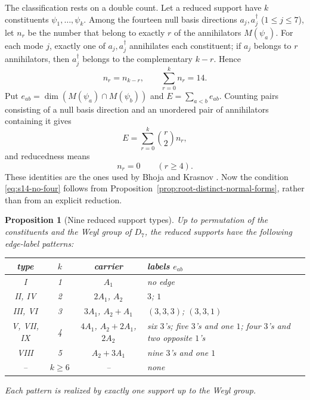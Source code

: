 \documentclass{article}
\newtheorem{proposition}[theorem]{Proposition}
\theoremstyle{definition}
\theoremstyle{remark}
\begin{document}
The classification rests on a double count. Let a reduced support
have $k$ constituents $\psi_1,\ldots,\psi_k$. Among the
fourteen null basis directions $a_j,a_j^\dagger$ ($1\le j\le7$), let $n_r$ be
the number that belong to exactly $r$ of the annihilators
$M(\psi_a)$. For each mode $j$, exactly one of $a_j,a_j^\dagger$ annihilates
each constituent; if $a_j$ belongs to $r$ annihilators, then $a_j^\dagger$
belongs to the complementary $k-r$. Hence
\begin{equation}
 n_r=n_{k-r},\qquad \sum_{r=0}^k n_r=14.
 \label{eq:s14-nr}
\end{equation}
Put $e_{ab}=\dim(M(\psi_a)\cap M(\psi_b))$ and $E=\sum_{a<b}e_{ab}$. Counting
pairs consisting of a null basis direction and an unordered pair of
annihilators containing it gives
\begin{equation}
 E=\sum_{r=0}^k\binom r2 n_r ,
 \label{eq:s14-incidence}
\end{equation}
and reducedness means
\begin{equation}
 n_r=0\qquad(r\ge4).
 \label{eq:s14-no-four}
\end{equation}
These identities are the ones used by Bhoja and Krasnov
\cite{BhojaKrasnov2025}. Now the condition
\eqref{eq:s14-no-four} follows from
Proposition~\ref{prop:root-distinct-normal-forms}, rather than from an
explicit reduction.

\begin{proposition}[Nine reduced support types]
\label{prop:s14-nine}
Up to permutation of the constituents and the Weyl group of $D_7$, the
reduced supports have the following edge-label patterns:
\begin{center}
\normalfont\small
\begin{tabular}{cccl}
\toprule
type & $k$ & carrier & labels $e_{ab}$\\
\midrule
I & 1 & $A_1$ & no edge\\
II, IV & 2 & $2A_1$, $A_2$ & $3$; $1$\\
III, VI & 3 & $3A_1$, $A_2{+}A_1$ & $(3,3,3)$; $(3,3,1)$\\
V, VII, IX & 4 & $4A_1$, $A_2{+}2A_1$, $2A_2$ & six $3$'s; five $3$'s and one $1$;
      four $3$'s and two opposite $1$'s\\
VIII & 5 & $A_2{+}3A_1$ & nine $3$'s and one $1$\\
-- & $k\ge6$ & -- & none\\
\bottomrule
\end{tabular}
\end{center}
Each pattern is realized by exactly one support up to the Weyl group.
\end{proposition}
\end{document}
